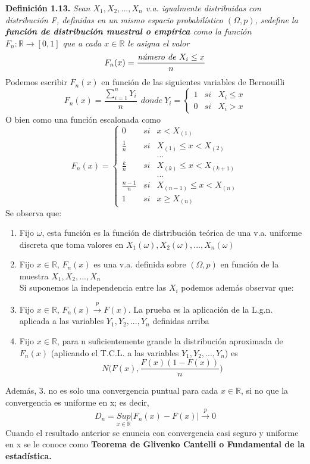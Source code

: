	\noindent\textbf{Definición 1.13.} \textit{Sean $X_1,X_2,...,X_n$ v.a. igualmente distribuidas con distribución F, definidas en un mismo espacio probabilístico $(\Omega,p)$, se\linebreak define la \textbf{función de distribución muestral o empírica} como la función \linebreak $F_n:\mathbb{R}\longrightarrow [0,1 ]$ que a cada $x\in\mathbb{R}$ le asigna el valor } $$F_n(x)=\frac{\text{\textit{número de $X_i\leq x$}}}{n}$$ Podemos escribir $F_n(x)$ en función de las siguientes variables de Bernouilli $$F_n(x)=\frac{\displaystyle\sum_{i=1}^{n}Y_i}{n}\ \ donde\ Y_i=\left\{ \begin{array}{lcc}
		1&si&X_i\leq x \\ 0&si&X_i>x
	\end{array}\right.$$ O bien como una función escalonada como $$F_n(x)=\left\{ \begin{array}{lcc}
	0&si&x<X_{(1)} \\ \frac{1}{n}&si&X_{(1)}\leq x<X_{(2)}\\ \ &\ & ...\\ \frac{k}{n}&si&X_{(k)}\leq x<X_{(k+1)}\\ \ &\ & ...\\ \frac{n-1}{n}&si&X_{(n-1)}\leq x<X_{(n)}\\ 1&si&x\geq X_{(n)}
\end{array}\right.$$ Se observa que: \begin{enumerate}
	\item Fijo $\omega$, esta función es la función de distribución teórica de una v.a. uniforme discreta que toma valores en $X_1(\omega),X_2(\omega),...,X_n(\omega)$
	
	\item Fijo $x\in\mathbb{R}$, $F_n(x)$ es una v.a. definida sobre $(\Omega, p)$ en función de la muestra $X_1,X_2,...,X_n$\\
	
	
	\noindent Si suponemos la independencia entre las $X_i$ podemos además observar que:
	
	\item Fijo $x\in\mathbb{R}$, $F_n(x)\xrightarrow{p}F(x)$. La prueba es la aplicación de la L.g.n. aplicada a las variables $Y_1,Y_2,...,Y_n$ definidas arriba
	
	\item Fijo $x\in\mathbb{R}$, para n suficientemente grande la distribución aproximada de $F_n(x)$ (aplicando el T.C.L. a las variables $Y_1, Y_2,...,Y_n$) es $$N\Biggl(F(x),\frac{F(x)(1-F(x))}{n}\Biggr)$$

\end{enumerate}
Además, 3. no es solo una convergencia puntual para cada $x\in\mathbb{R}$, si no que la convergencia es uniforme en x; es decir, $$D_n=\underset{x\in\mathbb{R}}{Sup}|F_n(x)-F(x)|\xrightarrow{p}0$$ Cuando el resultado anterior se enuncia con convergencia casi seguro y uniforme en x se le conoce como \textbf{Teorema de Glivenko Cantelli o Fundamental de la estadística.}
	